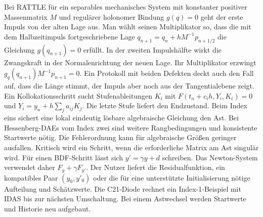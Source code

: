 Bei RATTLE für ein separables mechanisches System mit konstanter positiver Massenmatrix \(M\) und regulärer holonomer Bindung \(g(q)=0\) geht der erste Impuls von der alten Lage aus. Man wählt seinen Multiplikator so, dass die mit dem Halbzeitimpuls fortgeschriebene Lage \(q_{n+1}=q_n+hM^{-1}p_{n+1/2}\) die Gleichung \(g(q_{n+1})=0\) erfüllt. In der zweiten Impulshälfte wirkt die Zwangskraft in der Normalenrichtung der neuen Lage. Ihr Multiplikator erzwingt \(g_q(q_{n+1})M^{-1}p_{n+1}=0\). Ein Protokoll mit beiden Defekten deckt auch den Fall auf, dass die Länge stimmt, der Impuls aber noch aus der Tangentialebene zeigt.
\hypertarget{punkt4-4-1}{}
Ein Kollokationsschritt sucht Stufenableitungen \(K_i\) mit \(F(t_n+c_i h,Y_i,K_i)=0\) und \(Y_i=y_n+h\sum_j a_{ij}K_j\). Die letzte Stufe liefert den Endzustand. Beim Index eins sichert eine lokal eindeutig lösbare algebraische Gleichung den Ast. Bei Hessenberg-DAEs vom Index zwei sind weitere Rangbedingungen und konsistente Startwerte nötig. Die Fehlerordnung kann für algebraische Größen geringer ausfallen. Kritisch wird ein Schritt, wenn die erforderliche Matrix am Ast singulär wird.
\hypertarget{punkt4-4-2}{}
Für einen BDF-Schritt lässt sich \(y'=\gamma y+d\) schreiben. Das Newton-System verwendet daher \(F_y+\gamma F_{y'}\). Der Nutzer liefert die Residualfunktion, ein kompatibles Paar \((y_0,y'_0)\) oder die für eine unterstützte Initialisierung nötige Aufteilung und Schätzwerte. Die C21-Diode rechnet ein Index-1-Beispiel mit IDAS bis zur nächsten Umschaltung. Bei einem Astwechsel werden Startwerte und Historie neu aufgebaut.

